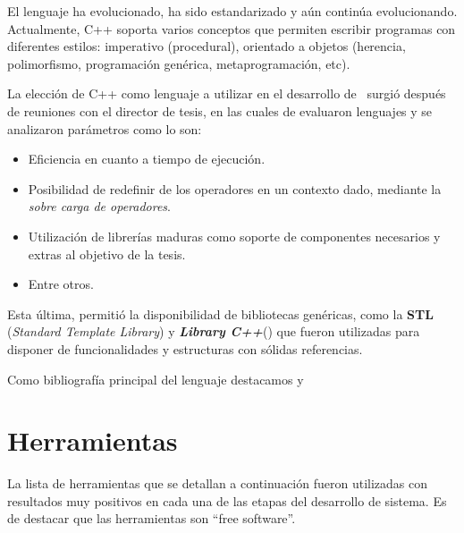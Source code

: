 El lenguaje ha evolucionado, ha sido estandarizado y aún continúa evolucionando. Actualmente, C++ soporta varios conceptos que permiten escribir programas con diferentes estilos: imperativo (procedural), orientado a objetos (herencia, polimorfismo, programación genérica, metaprogramación, etc).

La elección de C++ como lenguaje a utilizar en el desarrollo de \maggen\ surgió después de reuniones con el director de tesis, en las cuales de evaluaron lenguajes y se analizaron parámetros como lo son:

\begin{itemize}
\item Eficiencia en cuanto a tiempo de ejecución.

\item Posibilidad de redefinir de los operadores en un contexto dado, mediante la \textit{sobre carga de operadores}.

\item Utilización de librerías maduras como soporte de componentes necesarios y extras al objetivo de la tesis.

\item Entre otros.
\end{itemize}

Esta última, permitió la disponibilidad de bibliotecas genéricas, como la \textbf{STL} (\textit{Standard Template Library}) y \boost \textbf{\textit{Library C++}}(\cite{boost}) que fueron utilizadas para disponer de funcionalidades y estructuras con sólidas referencias.

Como bibliografía principal del lenguaje destacamos \cite{c++1} y \cite{c++2}

\section{Herramientas}
La lista de herramientas que se detallan a continuación fueron utilizadas con resultados muy positivos en cada una de las etapas del desarrollo de sistema. Es de destacar que las herramientas son ``free software''.

